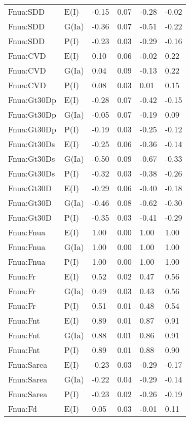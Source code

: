 \begin{center}
\begin{longtable}{|p{1.1in}|p{0.7in}|p{0.7in}|p{0.6in}|p{0.6in}|p{0.6in}|}
  Fnua:SDD & E(I) & -0.15 & 0.07 & -0.28 & -0.02 \\ 
  Fnua:SDD & G(Ia) & -0.36 & 0.07 & -0.51 & -0.22 \\ 
  Fnua:SDD & P(I) & -0.23 & 0.03 & -0.29 & -0.16 \\ 
  Fnua:CVD & E(I) & 0.10 & 0.06 & -0.02 & 0.22 \\ 
  Fnua:CVD & G(Ia) & 0.04 & 0.09 & -0.13 & 0.22 \\ 
  Fnua:CVD & P(I) & 0.08 & 0.03 & 0.01 & 0.15 \\ 
  Fnua:Gt30Dp & E(I) & -0.28 & 0.07 & -0.42 & -0.15 \\ 
  Fnua:Gt30Dp & G(Ia) & -0.05 & 0.07 & -0.19 & 0.09 \\ 
  Fnua:Gt30Dp & P(I) & -0.19 & 0.03 & -0.25 & -0.12 \\ 
  Fnua:Gt30Ds & E(I) & -0.25 & 0.06 & -0.36 & -0.14 \\ 
  Fnua:Gt30Ds & G(Ia) & -0.50 & 0.09 & -0.67 & -0.33 \\ 
  Fnua:Gt30Ds & P(I) & -0.32 & 0.03 & -0.38 & -0.26 \\ 
  Fnua:Gt30D & E(I) & -0.29 & 0.06 & -0.40 & -0.18 \\ 
  Fnua:Gt30D & G(Ia) & -0.46 & 0.08 & -0.62 & -0.30 \\ 
  Fnua:Gt30D & P(I) & -0.35 & 0.03 & -0.41 & -0.29 \\ 
  Fnua:Fnua & E(I) & 1.00 & 0.00 & 1.00 & 1.00 \\ 
  Fnua:Fnua & G(Ia) & 1.00 & 0.00 & 1.00 & 1.00 \\ 
  Fnua:Fnua & P(I) & 1.00 & 0.00 & 1.00 & 1.00 \\ 
  Fnua:Fr & E(I) & 0.52 & 0.02 & 0.47 & 0.56 \\ 
  Fnua:Fr & G(Ia) & 0.49 & 0.03 & 0.43 & 0.56 \\ 
  Fnua:Fr & P(I) & 0.51 & 0.01 & 0.48 & 0.54 \\ 
  Fnua:Fnt & E(I) & 0.89 & 0.01 & 0.87 & 0.91 \\ 
  Fnua:Fnt & G(Ia) & 0.88 & 0.01 & 0.86 & 0.91 \\ 
  Fnua:Fnt & P(I) & 0.89 & 0.01 & 0.88 & 0.90 \\ 
  Fnua:Sarea & E(I) & -0.23 & 0.03 & -0.29 & -0.17 \\ 
  Fnua:Sarea & G(Ia) & -0.22 & 0.04 & -0.29 & -0.14 \\ 
  Fnua:Sarea & P(I) & -0.23 & 0.02 & -0.26 & -0.19 \\ 
  Fnua:Fd & E(I) & 0.05 & 0.03 & -0.01 & 0.11 \\ 

\end{longtable}
\end{center}
